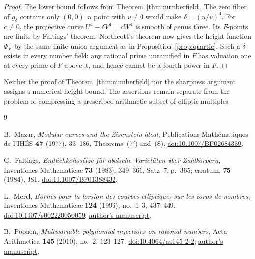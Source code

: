 \documentclass[11pt]{article}
\theoremstyle{remark}\newtheorem{remark}[theorem]{Remark}
\begin{document}
\begin{proof}
The lower bound follows from Theorem~\ref{thm:numberfield}.
The zero fiber of $g_\delta$ contains only $(0,0)$: a point with
$v\ne0$ would make $\delta=(u/v)^4$.
For $c\ne0$, the projective curve
$U^4-\delta V^4=cW^4$ is smooth of genus three.  Its $F$-points are
finite by Faltings' theorem.  Northcott's theorem now gives the
height function $\Phi_F$ by the same finite-union argument as in
Proposition~\ref{prop:quartic}.
Such a $\delta$ exists in every number field: any rational prime
unramified in $F$ has valuation one at every prime of $F$ above it,
and hence cannot be a fourth power in $F$.
\end{proof}

Neither the proof of Theorem~\ref{thm:numberfield} nor the sharpness
argument assigns a numerical height bound.  The assertions remain
separate from the problem of compressing a prescribed arithmetic
subset of elliptic multiples.

\begin{thebibliography}{9}
\raggedright
{}
B.~Mazur, \emph{Modular curves and the Eisenstein ideal},
Publications Math\'ematiques de l'IH\'ES \textbf{47} (1977), 33--186,
Theorems~(7$'$) and~(8).
\href{https://doi.org/10.1007/BF02684339}{doi:10.1007/BF02684339}.

G.~Faltings, \emph{Endlichkeitss\"atze f\"ur abelsche Variet\"aten
\"uber Zahlk\"orpern}, Inventiones Mathematicae \textbf{73} (1983),
349--366, Satz~7, p.~365; erratum, \textbf{75} (1984), 381.
\href{https://doi.org/10.1007/BF01388432}{doi:10.1007/BF01388432}.

L.~Merel, \emph{Bornes pour la torsion des courbes elliptiques sur les
corps de nombres}, Inventiones Mathematicae \textbf{124} (1996),
no.~1--3, 437--449.
\href{https://doi.org/10.1007/s002220050059}{doi:10.1007/s002220050059};
\href{https://perso.imj-prg.fr/wp-content/uploads/merel-pub/torsion.pdf}
{author's manuscript}.

B.~Poonen, \emph{Multivariable polynomial injections on rational numbers},
Acta Arithmetica \textbf{145} (2010), no.~2, 123--127.
\href{https://doi.org/10.4064/aa145-2-2}{doi:10.4064/aa145-2-2};
\href{https://math.mit.edu/~poonen/papers/QQ.pdf}{author's manuscript}.
\end{thebibliography}
\end{document}
